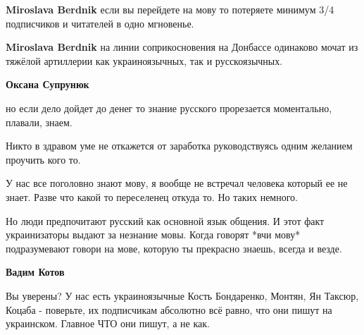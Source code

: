 \begin{itemize}
\begin{itemize}
\textbf{Miroslava Berdnik} если вы перейдете на мову то потеряете минимум 3/4 подписчиков и читателей в одно мгновенье.

 
\textbf{Miroslava Berdnik} на линии соприкосновения на Донбассе одинаково мочат из тяжёлой артиллерии как украиноязычных, так и русскоязычных.

 
\textbf{Оксана Супрунюк} 

но если дело дойдет до денег то знание русского прорезается моментально,
плавали, знаем.

Никто в здравом уме не откажется от заработка руководствуясь одним желанием
проучить кого то.


 

У нас все поголовно знают мову, я вообще не встречал человека который ее не
знает. Разве что какой то переселенец откуда то. Но таких немного.

Но люди предпочитают русский как основной язык общения. И этот факт
украинизаторы выдают за незнание мовы. Когда говорят *вчи мову* подразумевают
говори на мове, которую ты прекрасно знаешь, всегда и везде.

 
\textbf{Вадим Котов} 

Вы уверены? У нас есть украиноязычные Кость Бондаренко, Монтян, Ян Таксюр,
Коцаба - поверьте, их подписчикам абсолютно всё равно, что они пишут на
украинском. Главное ЧТО они пишут, а не как.



\end{itemize}
\end{itemize}
